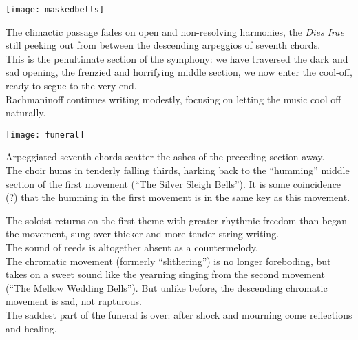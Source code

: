 \documentclass{beamer}
\begin{document}
\begin{frame}
  \begin{center} 
    \texttt{[image: maskedbells]} 
  \end{center} 
  The climactic passage fades on open and non-resolving harmonies, the \textit{Dies Irae} still peeking out from between the descending arpeggios of seventh chords. 
  \pause \\ 
  This is the penultimate section of the symphony: we have traversed the dark and sad opening, the frenzied and horrifying middle section, we now enter the cool-off, ready to segue to the very end. 
  \pause \\ 
  Rachmaninoff continues writing modestly, focusing on letting the music cool off naturally. 
\end{frame} 

\begin{frame} 
  \begin{center} 
    \texttt{[image: funeral]} 
  \end{center} 
  Arpeggiated seventh chords scatter the ashes of the preceding section away. 
  \pause \\
  The choir hums in tenderly falling thirds, harking back to the ``humming'' middle section of the first movement (``The Silver Sleigh Bells''). It is some coincidence (?) that the humming in the first movement is in the same key as this movement. 
\end{frame} 

\begin{frame} 
  The soloist returns on the first theme with greater rhythmic freedom than began the movement, sung over thicker and more tender string writing. 
  \pause \\ 
  The sound of reeds is altogether absent as a countermelody. 
  \pause \\ 
  The chromatic movement (formerly ``slithering'') is no longer foreboding, but takes on a sweet sound like the yearning singing from the second movement (``The Mellow Wedding Bells''). But unlike before, the descending chromatic movement is sad, not rapturous. 
  \pause \\ 
  The saddest part of the funeral is over: after shock and mourning come reflections and healing. 
\end{frame} 
\end{document}

